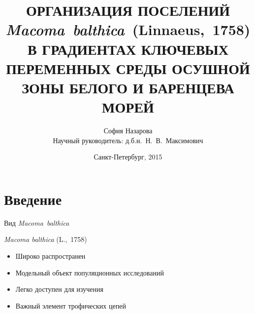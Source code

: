 \documentclass{beamer}
\begin{document}
\title[]{ОРГАНИЗАЦИЯ ПОСЕЛЕНИЙ {\it Macoma~balthica}~(Linnaeus,~1758) В ГРАДИЕНТАХ КЛЮЧЕВЫХ ПЕРЕМЕННЫХ СРЕДЫ ОСУШНОЙ ЗОНЫ БЕЛОГО И БАРЕНЦЕВА МОРЕЙ}
\author[С.А.~Назарова]{София Назарова \\ \medskip
	\footnotesize{Научный руководитель: д.б.н.~Н.~В.~Максимович}}
\date{Санкт-Петербург, 2015} 

\frame{\titlepage} 







		\section{Введение}
\begin{frame}{Вид {\it Macoma~balthica}}
	\begin{minipage}[b]{.39\linewidth}
		\begin{center}
		\end{center}
	\end{minipage}
	\begin{minipage}[b]{.49\linewidth}
{\it Macoma balthica} (L.,~1758)
		\begin{itemize}
			\item{Широко распространен}
			\item{Модельный объект популяционных исследований}
			\item{Легко доступен для изучения}
			\item{Важный элемент трофических цепей}
		\end{itemize}
	\end{minipage}
\end{frame}
\end{document}
